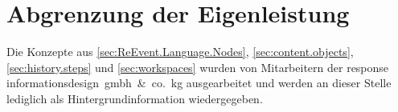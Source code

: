 \section{Abgrenzung der Eigenleistung}
\label{sec:abgrenzung-der-eigenleistung}

Die Konzepte aus \ref{sec:ReEvent.Language.Nodes}, \ref{sec:content.objects}, \ref{sec:history.steps} und \ref{sec:workspaces} wurden von Mitarbeitern der response informationsdesign~gmbh~\&~co.~kg ausgearbeitet und werden an dieser Stelle lediglich als Hintergrundinformation wiedergegeben.
